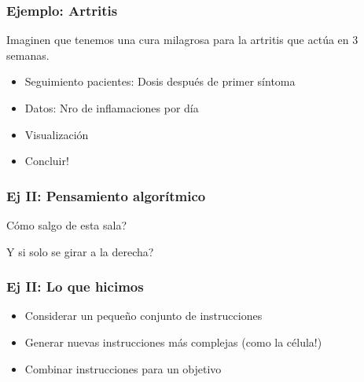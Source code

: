 \documentclass[14pt,aspectratio=169,xcolor=dvipsnames]{beamer}
\begin{document}
\begin{frame}[t]\frametitle{Ejemplo: Artritis}
Imaginen que tenemos una cura milagrosa para la artritis que actúa en 3 semanas. 
\begin{itemize}
    \item<1-> Seguimiento pacientes: Dosis después de primer síntoma
    \item<2-> Datos: Nro de inflamaciones por día
    \item<3-> Visualización
    \item<4-> Concluir!
\end{itemize}
\end{frame}
\begin{frame}\frametitle{Ej II: Pensamiento algorítmico}
Cómo salgo de esta sala? 

\vspace{2cm}
\pause Y si solo se girar a la derecha?

\end{frame}
\begin{frame}\frametitle{Ej II: Lo que hicimos}
    \begin{itemize}
        \item Considerar un pequeño conjunto de instrucciones
        \item Generar nuevas instrucciones más complejas {\color{gray}(como la célula!)}
        \item Combinar instrucciones para un objetivo
    \end{itemize}
\end{frame}
\end{document}
